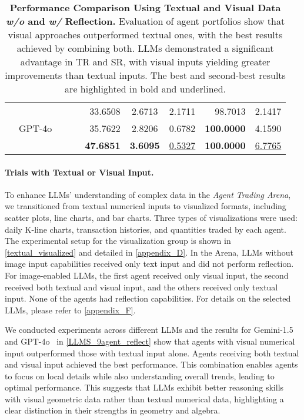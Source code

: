 \begin{table*}
\begin{tabular}{clccrccrr}
	\cmidrule(l){3-9}
	& \multirow{3}{*}{GPT-4o~\citep{GPT4o}} & \CIRCLE & \Circle & 33.6508 & 2.6713 & 2.1711 & 98.7013 & 2.1417 \\
	& & \Circle & \CIRCLE & 35.7622 & 2.8206 & 0.6782 & \textbf{100.0000} & 4.1590 \\
	& & \CIRCLE & \CIRCLE & \textbf{47.6851} & \textbf{3.6095} & \underline{0.5327} & \textbf{100.0000} & \underline{6.7765} \\
	\bottomrule[1.1pt]
	\end{tabular}
	\caption{\textbf{Performance Comparison Using Textual and Visual Data \textit{w/o} and \textit{w/} Reflection.} Evaluation of agent portfolios show that visual approaches outperformed textual ones, with the best results achieved by combining both. LLMs demonstrated a significant advantage in TR and SR, with visual inputs yielding greater improvements than textual inputs. The best and second-best results are highlighted in bold and underlined.}
	\label{LLMS_9agent_reflect}
    \vspace{-3pt}
\end{table*}




\vspace{-3pt}

\paragraph{Trials with Textual or Visual Input.}

To enhance LLMs' understanding of complex data in the \textit{Agent Trading Arena}, we transitioned from textual numerical inputs to visualized formats, including scatter plots, line charts, and bar charts. Three types of visualizations were used: daily K-line charts, transaction histories, and quantities traded by each agent. The experimental setup for the visualization group is shown in \autoref{textual_visualized} and detailed in \autoref{appendix_D}. In the Arena, LLMs without image input capabilities received only text input and did not perform reflection. For image-enabled LLMs, the first agent received only visual input, the second received both textual and visual input, and the others received only textual input. None of the agents had reflection capabilities. For details on the selected LLMs, please refer to \autoref{appendix_F}.

We conducted experiments across different LLMs and the results for Gemini-1.5~\citep{Gemini1.5} and GPT-4o~\citep{GPT4o} in \autoref{LLMS_9agent_reflect} show that agents with visual numerical input outperformed those with textual input alone. Agents receiving both textual and visual input achieved the best performance. This combination enables agents to focus on local details while also understanding overall trends, leading to optimal performance. This suggests that LLMs exhibit better reasoning skills with visual geometric data rather than textual numerical data, highlighting a clear distinction in their strengths in geometry and algebra.

